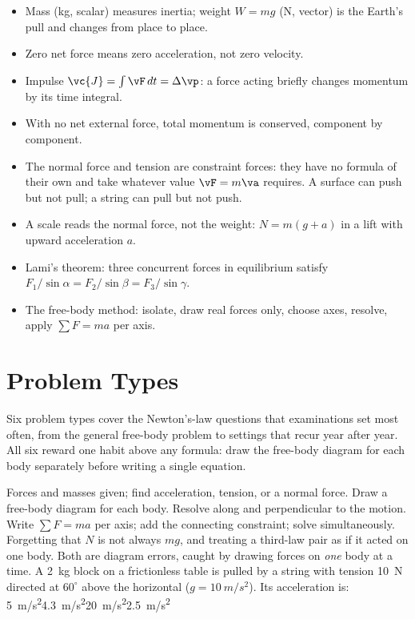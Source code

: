 \begin{itemize}
\item Mass (kg, scalar) measures inertia; weight $W=mg$ (N, vector) is the Earth's pull and changes from place to place.
\item Zero net force means zero acceleration, not zero velocity.
\item Impulse $\vc{J}=\int\vF\,dt=\Delta\vp$: a force acting briefly changes momentum by its time integral.
\item With no net external force, total momentum is conserved, component by component.
\item The normal force and tension are constraint forces: they have no formula of their own and take
      whatever value $\vF=m\va$ requires. A surface can push but not pull; a string can pull but not push.
\item A scale reads the normal force, not the weight: $N=m(g+a)$ in a lift with upward acceleration $a$.
\item Lami's theorem: three concurrent forces in equilibrium satisfy $F_1/\sin\alpha=F_2/\sin\beta=F_3/\sin\gamma$.
\item The free-body method: isolate, draw real forces only, choose axes, resolve, apply $\sum F=ma$ per axis.
\end{itemize}

\section{Problem Types}\label{sec:types7}
Six problem types cover the Newton's-law questions that examinations set most often, from the general
free-body problem to settings that recur year after year. All six reward one habit above any formula:
draw the free-body diagram for each body separately before writing a single equation.

{Forces and masses given; find acceleration, tension, or a normal force.}
{Draw a free-body diagram for each body. Resolve along and perpendicular to the motion. Write
$\sum F=ma$ per axis; add the connecting constraint; solve simultaneously.}
{Forgetting that $N$ is not always $mg$, and treating a third-law pair as if it acted on one body. Both
are diagram errors, caught by drawing forces on \emph{one} body at a time.}
{A \SI{2}{kg} block on a frictionless table is pulled by a string with tension \SI{10}{N} directed at
$60^\circ$ above the horizontal ($g=\SI{10}{m/s^2}$). Its acceleration is:}
{\SI{5}{m/s^2}}{\SI{4.3}{m/s^2}}{\SI{20}{m/s^2}}{\SI{2.5}{m/s^2}}

